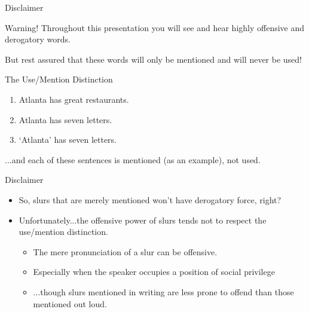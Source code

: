 \documentclass[xcolor=dvipsnames,12pt,handout]{beamer}
\begin{document}
\begin{frame}{Disclaimer}
\begin{block}{Warning!}
Throughout this presentation  you will see and hear highly offensive and derogatory words.
\end{block}
\pause
But rest assured that these words will only be mentioned and will never be used!
\pause
\begin{block}{The Use/Mention Distinction}
\pause
\begin{enumerate}
\item Atlanta has great restaurants.
\pause
\item Atlanta has seven letters.
\pause
\item `Atlanta' has seven letters.
\end{enumerate}
\pause
...and each of these sentences is mentioned (as an example), not used.
\end{block}
\end{frame}

\begin{frame}{Disclaimer}
\vspace{-1cm}
\begin{itemize}\setlength\itemsep{2.5mm}
\item So, slurs that are merely mentioned won't have derogatory force, right?
\pause
\item Unfortunately...the offensive power of slurs tends not to respect the use/mention distinction.
\pause
\begin{itemize}\setlength\itemsep{2.5mm}
\item The mere pronunciation of a slur can be offensive.
\pause
\item Especially when the speaker occupies a position of social privilege
\pause
\item ...though slurs mentioned in writing are less prone to offend than those mentioned out loud.
\end{itemize}
\end{itemize}
\end{frame}
\end{document}
